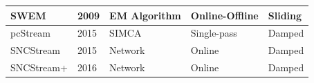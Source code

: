 \begin{table}[]
\begin{tabular}{lllll}
SWEM                & 2009          & EM Algorithm      & Online-Offline      & Sliding              \\ \hline
pcStream            & 2015          & SIMCA             & Single-pass         & Damped               \\ \hline
SNCStream           & 2015          & Network           & Online              & Damped               \\ \hline
SNCStream+          & 2016          & Network           & Online              & Damped               \\ \hline \midrule
\end{tabular}
\end{table}












